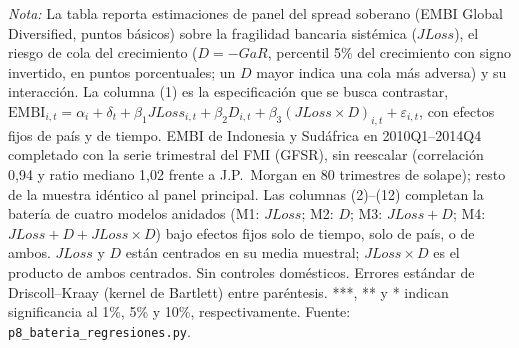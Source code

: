 \documentclass[11pt]{article}
\begin{document}
\begin{landscape}
\begin{table}
\par\smallskip\parbox{\linewidth}{\scriptsize \textit{Nota:} La tabla reporta estimaciones de panel del spread soberano (EMBI Global Diversified, puntos básicos) sobre la fragilidad bancaria sistémica ($JLoss$), el riesgo de cola del crecimiento ($D=-GaR$, percentil 5\% del crecimiento con signo invertido, en puntos porcentuales; un $D$ mayor indica una cola más adversa) y su interacción. La columna (1) es la especificación que se busca contrastar, $\mathrm{EMBI}_{i,t}=\alpha_i+\delta_t+\beta_1 JLoss_{i,t}+\beta_2 D_{i,t}+\beta_3(JLoss\times D)_{i,t}+\varepsilon_{i,t}$, con efectos fijos de país y de tiempo. EMBI de Indonesia y Sudáfrica en 2010Q1--2014Q4 completado con la serie trimestral del FMI (GFSR), sin reescalar (correlación 0,94 y ratio mediano 1,02 frente a J.P.\ Morgan en 80 trimestres de solape); resto de la muestra idéntico al panel principal. Las columnas (2)--(12) completan la batería de cuatro modelos anidados (M1: $JLoss$; M2: $D$; M3: $JLoss+D$; M4: $JLoss+D+JLoss\times D$) bajo efectos fijos solo de tiempo, solo de país, o de ambos. $JLoss$ y $D$ están centrados en su media muestral; $JLoss\times D$ es el producto de ambos centrados. Sin controles domésticos. Errores estándar de Driscoll--Kraay (kernel de Bartlett) entre paréntesis. ***, ** y * indican significancia al 1\%, 5\% y 10\%, respectivamente. Fuente: \texttt{p8\_bateria\_regresiones.py}.}
\end{table}
\end{landscape}

\clearpage
\end{document}
